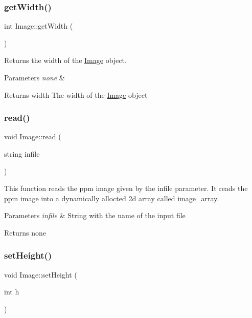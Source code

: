 \subsubsection{\texorpdfstring{get\+Width()}{getWidth()}}
{\footnotesize\ttfamily int Image\+::get\+Width (\begin{DoxyParamCaption}{ }\end{DoxyParamCaption})}

Returns the width of the \hyperlink{class_image}{Image} object.


\begin{DoxyParams}{Parameters}
{\em none} & \\
\hline
\end{DoxyParams}
\begin{DoxyReturn}{Returns}
width The width of the \hyperlink{class_image}{Image} object 
\end{DoxyReturn}
\mbox{\label{class_image_afd7841c2016dc76156a43cc4cd348680}} 
\subsubsection{\texorpdfstring{read()}{read()}}
{\footnotesize\ttfamily void Image\+::read (\begin{DoxyParamCaption}\item[{string}]{infile }\end{DoxyParamCaption})}

This function reads the ppm image given by the infile parameter. It reads the ppm image into a dynamically allocted 2d array called image\+\_\+array.


\begin{DoxyParams}{Parameters}
{\em infile} & String with the name of the input file \\
\hline
\end{DoxyParams}
\begin{DoxyReturn}{Returns}
none 
\end{DoxyReturn}
\mbox{\label{class_image_a6e15783dcc55c301f4e887e27a7c38be}} 
\subsubsection{\texorpdfstring{set\+Height()}{setHeight()}}
{\footnotesize\ttfamily void Image\+::set\+Height (\begin{DoxyParamCaption}\item[{int}]{h }\end{DoxyParamCaption})}

